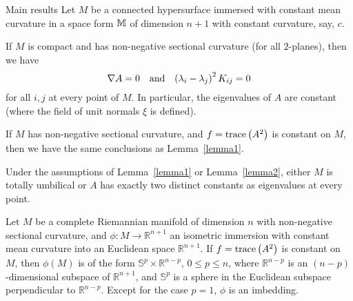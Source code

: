 \begin{frame}[allowframebreaks]{Main results}
  Let \(M\) be a connected hypersurface immersed with constant mean curvature
  in a space form \(\mathbb{M}\) of dimension \(n+1\) with constant
  curvature, say, \(c\).

  \framebreak

  \begin{lemma}\label{lemma1}
    If \(M\) is compact and has non-negative sectional curvature (for all
    \(2\)-planes), then we have
    \[
      \nabla{A}=0
      \quad\text{and}\quad{\left(\lambda_{i}-\lambda_{j}\right)^{2}K_{ij}=0}
    \]
    for all \(i,j\) at every point of \(M\). In particular, the eigenvalues of
    \(A\) are constant (where the field of unit normals \(\xi\) is defined).
  \end{lemma}

  \framebreak

  \begin{lemma}\label{lemma2}
    If \(M\) has non-negative sectional curvature, and \(f=\text{trace}\left({A^{2}}\right)\) is
    constant on \(M\), then we have the same conclusions as Lemma~\ref{lemma1}.
  \end{lemma}
  
  \framebreak

  \begin{lemma}\label{lemma3}
    Under the assumptions of Lemma~\ref{lemma1} or Lemma~\ref{lemma2}, either
    \(M\) is totally umbilical or \(A\) has exactly two distinct constants as
    eigenvalues at every point.
  \end{lemma}

  \framebreak

  \begin{theorem}\label{theorem1}
    Let \(M\) be a complete Riemannian manifold of dimension \(n\) with
    non-negative sectional curvature, and \(\phi:M\to\mathbb{R}^{n+1}\) an
    isometric immersion with constant mean curvature into an Euclidean space
    \(\mathbb{R}^{n+1}\). If \(f=\text{trace}\left({A^{2}}\right)\) is constant on \(M\), then
    \(\phi(M)\) is of the form \(\mathbb{S}^{p}\times\mathbb{R}^{n-p}\),
    \(0\leqslant{p}\leqslant{n}\), where \(\mathbb{R}^{n-p}\) is an
    \((n-p)\)-dimensional subspace of \(\mathbb{R}^{n+1}\), and
    \(\mathbb{S}^{p}\) is a sphere in the Euclidean subspace perpendicular to
    \(\mathbb{R}^{n-p}\). Except for the case \(p=1\), \(\phi\) is an
    imbedding.
  \end{theorem}

  \framebreak


\end{frame}
